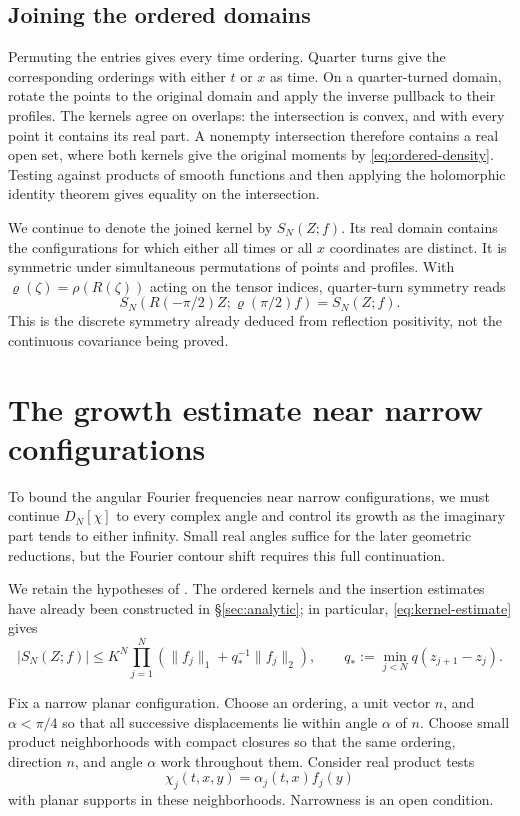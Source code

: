 \documentclass[11pt, letterpaper, reqno]{amsart}
\theoremstyle{definition}
\theoremstyle{remark}
\begin{document}
\subsection{Joining the ordered domains}\label{subsec:joining}

Permuting the entries gives every time ordering. Quarter turns give
the corresponding orderings with either $t$ or $x$ as time. On a
quarter-turned domain, rotate the points to the original domain and
apply the inverse pullback to their profiles. The kernels agree on
overlaps: the intersection is convex, and with every point it contains
its real part. A nonempty intersection therefore contains a real open
set, where both kernels give the original moments by
\eqref{eq:ordered-density}. Testing against products of smooth
functions and then applying the holomorphic identity theorem gives
equality on the intersection.

We continue to denote the joined kernel by $S_N(Z;f)$. Its real domain
contains the configurations for which either all times or all $x$
coordinates are distinct. It is symmetric under simultaneous
permutations of points and profiles. With
$\varrho(\zeta)=\rho(R(\zeta))$ acting on the tensor indices,
quarter-turn symmetry reads
\begin{equation}\label{eq:kernel-quarter}
 S_N(R(-\pi/2)Z;\varrho(\pi/2)f)=S_N(Z;f).
\end{equation}
This is the discrete symmetry already deduced from reflection
positivity, not the continuous covariance being proved.


\section{The growth estimate near narrow configurations}\label{sec:growth}

To bound the angular Fourier frequencies near narrow configurations,
we must continue $D_N[\chi]$ to every complex angle and control its
growth as the imaginary part tends to either infinity. Small real
angles suffice for the later geometric reductions, but the Fourier
contour shift requires this full continuation.

We retain the hypotheses of . The ordered kernels and
the insertion estimates have already been constructed in
\S\ref{sec:analytic}; in particular, \eqref{eq:kernel-estimate} gives
\[
 |S_N(Z;f)|\le K^N\prod_{j=1}^N
       (\|f_j\|_1+q_*^{-1}\|f_j\|_2),
 \qquad q_*:=\min_{j<N}q(z_{j+1}-z_j).
\]

Fix a narrow planar configuration. Choose an ordering, a unit vector
$n$, and $\alpha<\pi/4$ so that all successive displacements lie
within angle $\alpha$ of $n$. Choose small product neighborhoods with
compact closures so that the same ordering, direction $n$, and
angle $\alpha$ work throughout them. Consider real product tests
\[
 \chi_j(t,x,y)=\alpha_j(t,x)f_j(y)
\]
with planar supports in these neighborhoods. Narrowness is an open condition.
\end{document}
